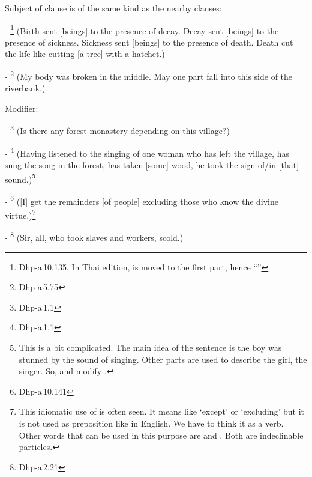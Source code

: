 \begin{compactenum}[(1)]
\begin{compactenum}[(a)]
\item Subject of  clause is of the same kind as the nearby clauses:\par
- \footnote{Dhp-a\,10.135. In Thai edition,  is moved to the first part, hence ``''} (Birth sent [beings] to the presence of decay. Decay sent [beings] to the presence of sickness. Sickness sent [beings] to the presence of death. Death cut the life like cutting [a tree] with a hatchet.)\par
- \footnote{Dhp-a\,5.75} (My body was broken in the middle. May one part fall into this side of the riverbank.)\par
\end{compactenum}

\item Modifier:\par
- \footnote{Dhp-a\,1.1} (Is there any forest monastery depending on this village?)\par
- \footnote{Dhp-a\,1.1} (Having listened to the singing of one woman who has left the village, has sung the song in the forest, has taken [some] wood, he took the sign of/in [that] sound.)\footnote{This is a bit complicated. The main idea of the sentence is the boy was stunned by the sound of singing. Other parts are used to describe the girl, the singer. So,  and  modify .}\par
- \footnote{Dhp-a\,10.141} ([I] get the remainders [of people] excluding those who know the divine virtue.)\footnote{This idiomatic use of  is often seen. It means like `except' or `excluding' but it is not used as preposition like in English. We have to think it as a verb. Other words that can be used in this purpose are  and . Both are indeclinable particles.}\par
- \footnote{Dhp-a\,2.21} (Sir, all, who took slaves and workers, scold.)\par


\end{compactenum}
